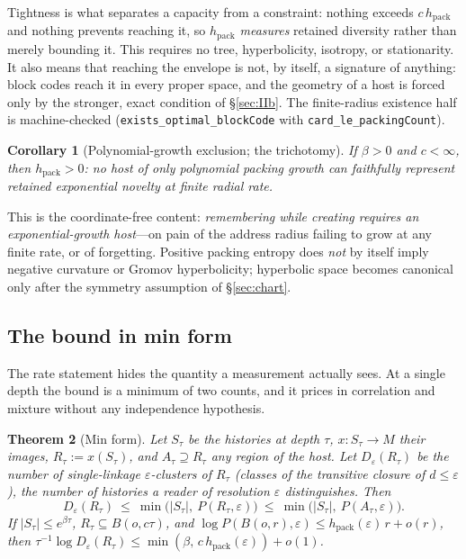 \documentclass[11pt,reqno]{amsart}
\theoremstyle{plain}
\newtheorem{theorem}{Theorem}[section]
\newtheorem{corollary}[theorem]{Corollary}
\theoremstyle{definition}
\newcommand{\hpack}{h_{\mathrm{pack}}}
\newcommand{\eps}{\varepsilon}
\begin{document}
Tightness is what separates a capacity from a constraint: nothing exceeds $c\,\hpack$ and nothing prevents reaching it, so $\hpack$ \emph{measures} retained diversity rather than merely bounding it. This requires no tree, hyperbolicity, isotropy, or stationarity. It also means that reaching the envelope is not, by itself, a signature of anything: block codes reach it in every proper space, and the geometry of a host is forced only by the stronger, exact condition of \S\ref{sec:IIb}. The finite-radius existence half is machine-checked (\texttt{exists\_\allowbreak{}optimal\_\allowbreak{}blockCode} with \texttt{card\_\allowbreak{}le\_\allowbreak{}packingCount}).

\begin{corollary}[Polynomial-growth exclusion; the trichotomy]\label{cor:poly}
If $\beta>0$ and $c<\infty$, then $\hpack>0$: no host of only polynomial packing growth can faithfully represent retained exponential novelty at finite radial rate.
\end{corollary}

This is the coordinate-free content: \emph{remembering while creating requires an exponential-growth host}---on pain of the address radius failing to grow at any finite rate, or of forgetting. Positive packing entropy does \emph{not} by itself imply negative curvature or Gromov hyperbolicity; hyperbolic space becomes canonical only after the symmetry assumption of \S\ref{sec:chart}.

\subsection{The bound in min form}\label{sec:minform}

The rate statement hides the quantity a measurement actually sees. At a single depth the bound is a minimum of two counts, and it prices in correlation and mixture without any independence hypothesis.

\begin{theorem}[Min form]\label{thm:minform}
Let $S_\tau$ be the histories at depth $\tau$, $x:S_\tau\to M$ their images, $R_\tau:=x(S_\tau)$, and $A_\tau\supseteq R_\tau$ any region of the host. Let $D_\eps(R_\tau)$ be the number of single-linkage $\eps$-clusters of $R_\tau$ (classes of the transitive closure of $d\le\eps$), the number of histories a reader of resolution $\eps$ distinguishes. Then
\[
D_\eps(R_\tau)\ \le\ \min\big(|S_\tau|,\ P(R_\tau,\eps)\big)\ \le\ \min\big(|S_\tau|,\ P(A_\tau,\eps)\big).
\]
If $|S_\tau|\le e^{\beta\tau}$, $R_\tau\subseteq B(o,c\tau)$, and $\log P(B(o,r),\eps)\le\hpack(\eps)\,r+o(r)$, then $\tau^{-1}\log D_\eps(R_\tau)\le\min(\beta,\,c\,\hpack(\eps))+o(1)$.
\end{theorem}
\end{document}
